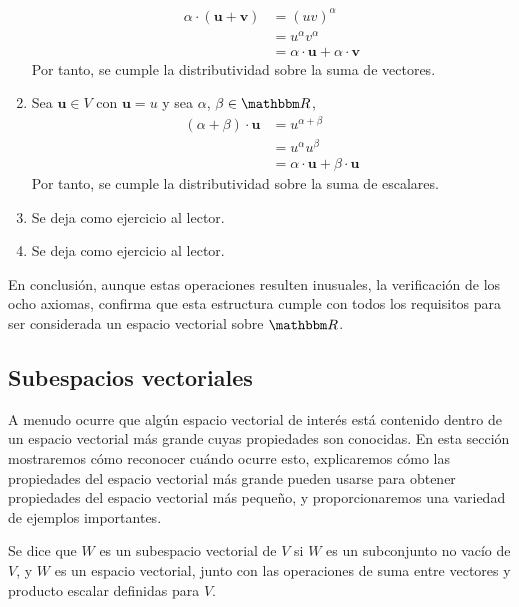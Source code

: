 \begin{examplebox}{}{}
\begin{enumerate}[label=\roman*), topsep=6pt, itemsep=0pt]
\begin{align*}
            \alpha \cdot (\mathbf{u} + \mathbf{v}) & = (uv)^{\alpha} \\
            & = u^{\alpha} v^{\alpha} \\
            & = \alpha \cdot \mathbf{u} + \alpha \cdot \mathbf{v}
        \end{align*}
        Por tanto, se cumple la distributividad sobre la suma de vectores.
        \item Sea $\mathbf{u} \in V$ con $\mathbf{u} = u$ y sea $\alpha$, $\beta \in \RR$,
        \begin{align*}
            (\alpha + \beta) \cdot \mathbf{u} & = u^{\alpha + \beta} \\
            & = u^{\alpha} u^{\beta} \\
            & = \alpha \cdot \mathbf{u} + \beta \cdot \mathbf{u}
        \end{align*}
        Por tanto, se cumple la distributividad sobre la suma de escalares.
        \item Se deja como ejercicio al lector.
        \item Se deja como ejercicio al lector.
    \end{enumerate}
    En conclusión, aunque estas operaciones resulten inusuales, la verificación de los ocho axiomas, confirma que esta estructura cumple con todos los requisitos para ser considerada un espacio vectorial sobre $\RR$.
\end{examplebox}

\newpage

\subsection{Subespacios vectoriales}

A menudo ocurre que algún espacio vectorial de interés está contenido dentro de un espacio vectorial más grande cuyas propiedades son conocidas. En esta sección mostraremos cómo reconocer cuándo ocurre esto, explicaremos cómo las propiedades del espacio vectorial más grande pueden usarse para obtener propiedades del espacio vectorial más pequeño, y proporcionaremos una variedad de ejemplos importantes.

\begin{definicion}{}{}
    Se dice que $W$ es un subespacio vectorial de $V$ si $W$ es un subconjunto no vacío de $V$, y $W$ es un espacio vectorial, junto con las operaciones de suma entre vectores y producto escalar definidas para $V$.
\end{definicion}

